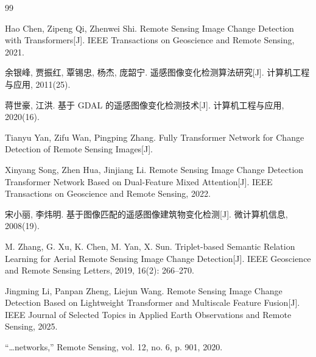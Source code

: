 \renewcommand{\refname}{十五、参考文献}

\begin{thebibliography}{99}

 Hao Chen, Zipeng Qi, Zhenwei Shi. Remote Sensing Image Change Detection with Transformers[J]. IEEE Transactions on Geoscience and Remote Sensing, 2021.

 余银峰, 贾振红, 覃锡忠, 杨杰, 庞韶宁. 遥感图像变化检测算法研究[J]. 计算机工程与应用, 2011(25).

 蒋世豪, 江洪. 基于 GDAL 的遥感图像变化检测技术[J]. 计算机工程与应用, 2020(16).

 Tianyu Yan, Zifu Wan, Pingping Zhang. Fully Transformer Network for Change Detection of Remote Sensing Images[J].

 Xinyang Song, Zhen Hua, Jinjiang Li. Remote Sensing Image Change Detection Transformer Network Based on Dual-Feature Mixed Attention[J]. IEEE Transactions on Geoscience and Remote Sensing, 2022.

 宋小丽, 李炜明. 基于图像匹配的遥感图像建筑物变化检测[J]. 微计算机信息, 2008(19).

 M. Zhang, G. Xu, K. Chen, M. Yan, X. Sun. Triplet-based Semantic Relation Learning for Aerial Remote Sensing Image Change Detection[J]. IEEE Geoscience and Remote Sensing Letters, 2019, 16(2): 266--270.

 Jingming Li, Panpan Zheng, Liejun Wang. Remote Sensing Image Change Detection Based on Lightweight Transformer and Multiscale Feature Fusion[J]. IEEE Journal of Selected Topics in Applied Earth Observations and Remote Sensing, 2025.

 ``\ldots networks,'' Remote Sensing, vol. 12, no. 6, p. 901, 2020.

\end{thebibliography}
